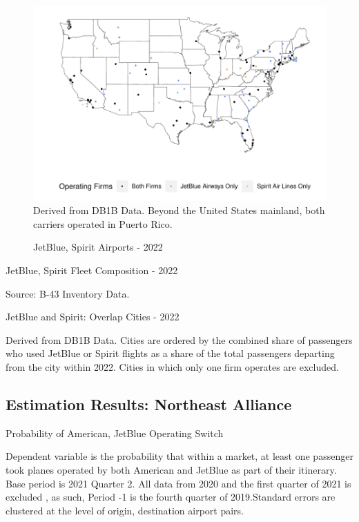 \documentclass{article}
\let\Oldsubsection\subsection
\renewcommand{\subsection}{\FloatBarrier\Oldsubsection}
\begin{document}
\begin{appendices}
\begin{figure}
	\caption{JetBlue, Spirit Airports - 2022}
	\label{fig:JBSpirit_Airports_2022}
	\includegraphics[width = \linewidth]{Map_Mainland_Both_2022.pdf}
	\footnotesize{Derived from DB1B Data. Beyond the United States mainland, both carriers operated in Puerto Rico.}
\end{figure}

\begin{table}
	\begin{center}
		\caption{JetBlue, Spirit Fleet Composition - 2022}
		\label{tab:JetBlueSpirit_Fleet}
		
	\end{center}
	\footnotesize{Source: B-43 Inventory Data. }
\end{table}

	\begin{table}
		\caption{JetBlue and Spirit: Overlap Cities - 2022}
		\label{tab:KeyCities}
		
		\footnotesize{Derived from DB1B Data. Cities are ordered by the combined share of passengers who used JetBlue or Spirit flights as a share of the total passengers departing from the city within 2022. Cities in which only one firm operates are excluded.}
	\end{table}

	
	\FloatBarrier
	
	\subsection{Estimation Results: Northeast Alliance}

	\begin{table}
	\caption{Probability of American, JetBlue Operating Switch}
	\label{tab:NEA_Switch_Prob}
	
	\footnotesize{Dependent variable is the probability that within a market, at least one passenger took planes operated by both American and JetBlue as part of their itinerary. Base period is 2021 Quarter 2. All data from 2020 and the first quarter of 2021 is excluded , as such,  Period -1 is the fourth quarter of 2019.Standard errors are clustered at the level of origin, destination airport pairs.}
\end{table}
	

\end{appendices}
\end{document}
